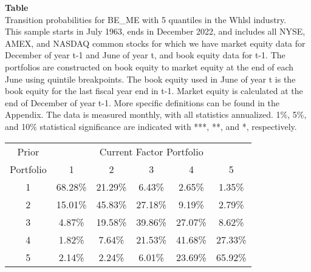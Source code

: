 \begin{table*}[ht!]
\raggedright
{}
\label{tab: transition_probs_BE_ME_Whlsl_with_5_quantiles}
\textbf{Table \thetable} \\
Transition probabilities for BE_ME with 5 quantiles in the Whlsl industry. \\
\hspace*{1em}This sample starts in July 1963, ends in December 2022, and includes all NYSE, AMEX, and NASDAQ common stocks for which we have market equity data for December of year t-1 and June of year t, and book equity data for t-1. The portfolios are constructed on book equity to market equity at the end of each June using quintile breakpoints.  The book equity used in June of year t is the book equity for the last fiscal year end in t-1.  Market equity is calculated at the end of December of year t-1.  More specific definitions can be found in the Appendix.  The data is measured monthly, with all statistics annualized.  1\%, 5\%, and 10\% statistical significance are indicated with ***, **, and *, respectively. \\
\vspace{0.5em}
\centering
\begin{adjustbox}{max width=\textwidth}
\begin{tabular}{@{}cccccc@{}}
\toprule
Prior & \multicolumn{5}{c}{Current Factor Portfolio} \\
Portfolio & 1 & 2 & 3 & 4 & 5 \\
\midrule
1 & 68.28\% & 21.29\% & 6.43\% & 2.65\% & 1.35\% \\
2 & 15.01\% & 45.83\% & 27.18\% & 9.19\% & 2.79\% \\
3 & 4.87\% & 19.58\% & 39.86\% & 27.07\% & 8.62\% \\
4 & 1.82\% & 7.64\% & 21.53\% & 41.68\% & 27.33\% \\
5 & 2.14\% & 2.24\% & 6.01\% & 23.69\% & 65.92\% \\
\bottomrule
\end{tabular}
\end{adjustbox}
\end{table*}